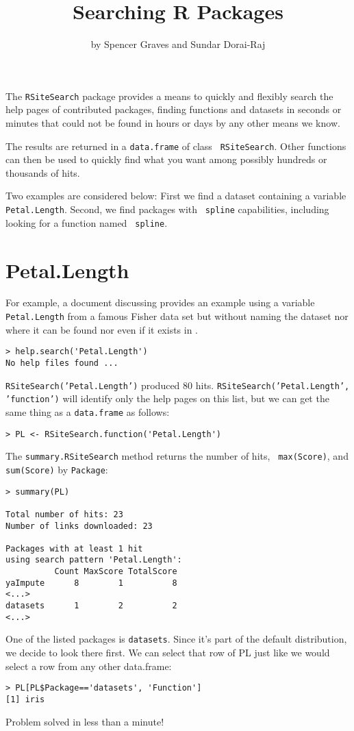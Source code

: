 \title{Searching R Packages}
\author{by Spencer Graves and Sundar Dorai-Raj}

\maketitle

The {\tt RSiteSearch} package provides a means to quickly and
flexibly search the help pages of contributed packages, finding
functions and datasets in seconds or minutes that could not be
found in hours or days by any other means we know.

The results are returned in a {\tt data.frame} of class {\tt
RSiteSearch}.  Other \R{} functions can then be used to quickly find
what you want among possibly hundreds or thousands of hits.

Two examples are considered below:  First we find a dataset containing
a variable {\tt Petal.Length}.  Second, we find packages with {\tt
  spline} capabilities, including looking for a function named {\tt
  spline}.

\section*{Petal.Length}

For example, a document discussing \R{} provides an example using a
variable {\tt Petal.Length} from a famous Fisher data set but without
naming the dataset nor where it can be found nor even if it exists in
\R{}.
\begin{verbatim}
> help.search('Petal.Length')
No help files found ...
\end{verbatim}
{\tt RSiteSearch('Petal.Length')} produced 80 hits.  
{\tt RSiteSearch('Petal.Length', 'function')} will identify only 
the help pages on this list, but we can get the same thing as a 
{\tt data.frame} as follows:  
\begin{verbatim}
> PL <- RSiteSearch.function('Petal.Length')
\end{verbatim}
The {\tt summary.RSiteSearch} method returns the number of hits, {\tt
max(Score)}, and {\tt sum(Score)} by {\tt Package}:
\begin{verbatim}
> summary(PL)

Total number of hits: 23
Number of links downloaded: 23

Packages with at least 1 hit
using search pattern 'Petal.Length':
          Count MaxScore TotalScore
yaImpute      8        1          8
<...>
datasets      1        2          2
<...>
\end{verbatim}
One of the listed packages is {\tt datasets}.  Since it's part of the
default \R{} distribution, we decide to look there first.  We can
select that row of PL just like we would select a row from any other
data.frame:
\begin{verbatim}
> PL[PL$Package=='datasets', 'Function']
[1] iris
\end{verbatim}
Problem solved in less than a minute!

